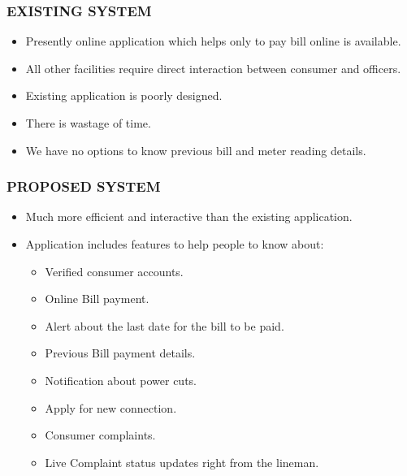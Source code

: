 \documentclass{beamer} %
\theoremstyle{definition} %
\begin{document}
\begin{frame}
\frametitle{EXISTING SYSTEM}
	\begin{itemize}
		\item Presently online application which helps only to pay bill online is available.
		\item All other facilities require direct interaction between consumer and officers.
		\item Existing application is poorly designed.
		\item There is wastage of time. 
		\item We have no options to know previous bill and meter reading details.
	\end{itemize}
	\end{frame}
	\begin{frame}
	\frametitle{PROPOSED SYSTEM}
	\begin{itemize}
		\item Much more efficient and interactive than the existing application.
		\item Application includes features to help people to know about:
		\begin{itemize}
		\item  Verified consumer accounts.
		\item  Online Bill payment.
		\item  Alert about the last date for the bill to be paid.
		\item  Previous Bill payment details.
		\item  Notification about power cuts.
		\item  Apply for new connection.
		\item  Consumer complaints.
		\item  Live Complaint status updates right from the lineman.
		\end{itemize} 
		
	
	\end{itemize}
\end{frame}
\end{document}
